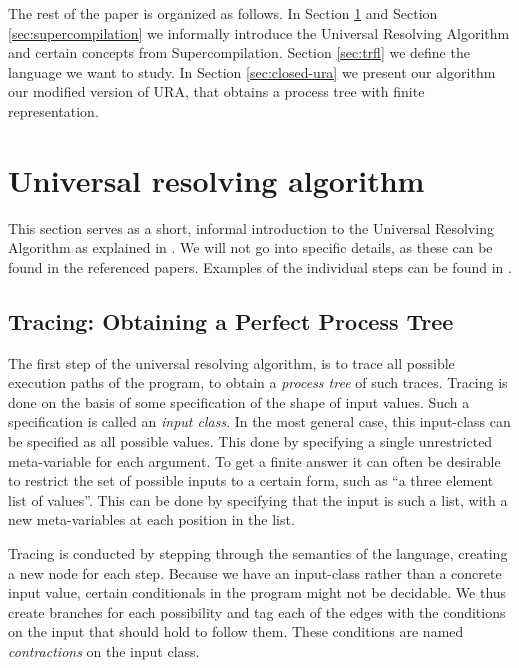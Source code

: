 \documentclass[10pt]{../sigplanconf}
\begin{document}
The rest of the paper is organized as follows. In Section
\ref{sec:ura} and Section \ref{sec:supercompilation} we informally
introduce the Universal Resolving Algorithm and certain concepts from
Supercompilation. Section \ref{sec:trfl} we define the language we
want to study. In Section \ref{sec:closed-ura} we present our
algorithm our modified version of URA, that obtains a process tree
with finite representation.


\section{Universal resolving algorithm}
\label{sec:ura}
This section serves as a short, informal introduction to the Universal
Resolving Algorithm as explained in \cite{abramov2000universal,
  abramov2002universal, abramov2002principles}. We will not go into
specific details, as these can be found in the referenced
papers. Examples of the individual steps can be found in
\cite{abramov2000universal}.

\subsection{Tracing: Obtaining a Perfect Process Tree}
The first step of the universal resolving algorithm, is to trace all
possible execution paths of the program, to obtain a \textit{process
  tree} of such traces. Tracing is done on the basis of some
specification of the shape of input values. Such a specification is
called an \textit{input class}. In the most general case, this
input-class can be specified as all possible values. This done by
specifying a single unrestricted meta-variable for each argument. To
get a finite answer it can often be desirable to restrict the set of
possible inputs to a certain form, such as ``a three element list of
values''. This can be done by specifying that the input is such a
list, with a new meta-variables at each position in the list. 

Tracing is conducted by stepping through the semantics of the
language, creating a new node for each step. Because we have an
input-class rather than a concrete input value, certain conditionals
in the program might not be decidable. We thus create branches for
each possibility and tag each of the edges with the conditions on the
input that should hold to follow them. These conditions are named
\textit{contractions} on the input class.
\end{document}
